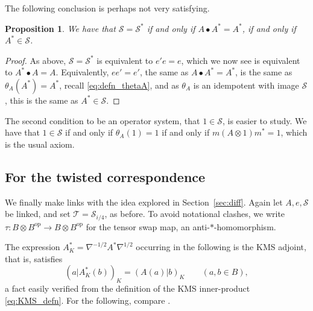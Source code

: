 \documentclass[a4paper,11pt]{article}
\theoremstyle{plain}
\newtheorem{proposition}{Proposition}[section]
\theoremstyle{remark}
\newcommand{\mc}[1]{\mathcal{#1}}
\newcommand{\op}{{\operatorname{op}}}
\begin{document}
The following conclusion is perhaps not very satisfying.

\begin{proposition}
We have that $\mc S = \mc S^*$ if and only if $A \bullet A^* = A^*$, if and only if $A^*\in\mc S$.
\end{proposition}
\begin{proof}
As above, $\mc S= \mc S^*$ is equivalent to $e'e=e$, which we now see is equivalent to $A^* \bullet A = A$.  Equivalently, $ee'=e'$, the same as $A \bullet A^* = A^*$, is the same as $\theta_A(A^*) = A^*$, recall \eqref{eq:defn_thetaA}, and as $\theta_A$ is an idempotent with image $\mc S$, this is the same as $A^* \in \mc S$.
\end{proof}

The second condition to be an operator system, that $1\in\mc S$, is easier to study.  We have that $1\in\mc S$ if and only if $\theta_A(1)=1$ if and only if $m(A\otimes 1)m^* = 1$, which is the usual axiom.


\subsection{For the twisted correspondence}\label{sec:twisted_corr}

We finally make links with the idea explored in Section~\ref{sec:diff}.  Again let $A, e, \mc S$ be linked, and set $\mc T = \mc S_{i/4}$, as before.
To avoid notational clashes, we write $\tau \colon B\otimes B^\op \to B\otimes B^\op$ for the tensor swap map, an anti-$*$-homomorphism.

The expression $A^*_K = \nabla^{-1/2} A^* \nabla^{1/2}$ occurring in the following is the KMS adjoint, that is, satisfies
\[ (a|A^*_K(b))_K = (A(a)|b)_K  \qquad (a,b\in B), \]
a fact easily verified from the definition of the KMS inner-product \eqref{eq:KMS_defn}.
For the following, compare \cite[Theorem~A]{Wasilewski_Quantum_Cayley}.
\end{document}
